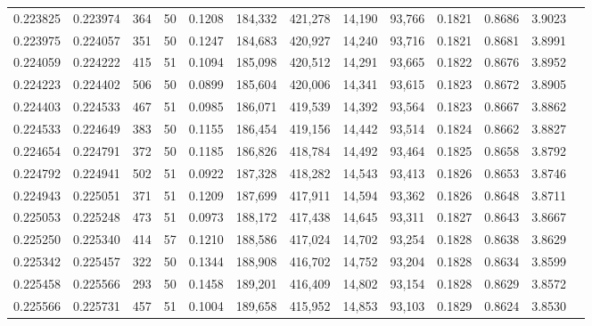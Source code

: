 \begin{tabular}{rrrrrrrrrrrrr}
0.223825 & 0.223974 &   364 &  50 &                                     0.1208 & 184,332 & 421,278 &  14,190 &  93,766 & 0.1821 & 0.8686 & 3.9023 \\
0.223975 & 0.224057 &   351 &  50 &                                     0.1247 & 184,683 & 420,927 &  14,240 &  93,716 & 0.1821 & 0.8681 & 3.8991 \\
0.224059 & 0.224222 &   415 &  51 &                                     0.1094 & 185,098 & 420,512 &  14,291 &  93,665 & 0.1822 & 0.8676 & 3.8952 \\
0.224223 & 0.224402 &   506 &  50 &                                     0.0899 & 185,604 & 420,006 &  14,341 &  93,615 & 0.1823 & 0.8672 & 3.8905 \\
0.224403 & 0.224533 &   467 &  51 &                                     0.0985 & 186,071 & 419,539 &  14,392 &  93,564 & 0.1823 & 0.8667 & 3.8862 \\
0.224533 & 0.224649 &   383 &  50 &                                     0.1155 & 186,454 & 419,156 &  14,442 &  93,514 & 0.1824 & 0.8662 & 3.8827 \\
0.224654 & 0.224791 &   372 &  50 &                                     0.1185 & 186,826 & 418,784 &  14,492 &  93,464 & 0.1825 & 0.8658 & 3.8792 \\
0.224792 & 0.224941 &   502 &  51 &                                     0.0922 & 187,328 & 418,282 &  14,543 &  93,413 & 0.1826 & 0.8653 & 3.8746 \\
0.224943 & 0.225051 &   371 &  51 &                                     0.1209 & 187,699 & 417,911 &  14,594 &  93,362 & 0.1826 & 0.8648 & 3.8711 \\
0.225053 & 0.225248 &   473 &  51 &                                     0.0973 & 188,172 & 417,438 &  14,645 &  93,311 & 0.1827 & 0.8643 & 3.8667 \\
0.225250 & 0.225340 &   414 &  57 &                                     0.1210 & 188,586 & 417,024 &  14,702 &  93,254 & 0.1828 & 0.8638 & 3.8629 \\
0.225342 & 0.225457 &   322 &  50 &                                     0.1344 & 188,908 & 416,702 &  14,752 &  93,204 & 0.1828 & 0.8634 & 3.8599 \\
0.225458 & 0.225566 &   293 &  50 &                                     0.1458 & 189,201 & 416,409 &  14,802 &  93,154 & 0.1828 & 0.8629 & 3.8572 \\
0.225566 & 0.225731 &   457 &  51 &                                     0.1004 & 189,658 & 415,952 &  14,853 &  93,103 & 0.1829 & 0.8624 & 3.8530 \\

\end{tabular}
